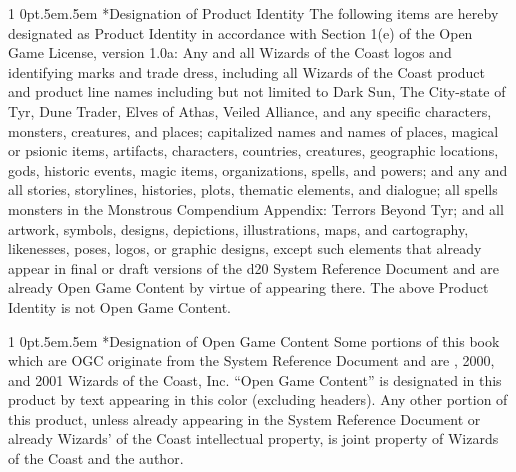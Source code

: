 \documentclass[onecolumn,oneside]{d20}
\makeatletter
\renewcommand\section{
  \@startsection{section}
  {1}
  {0pt}{.5em}{.5em}{\color{ChapterColor}\Large\scshape\raggedleft\imfellEnglish}
}
\makeatother
\begin{document}
\section*{Designation of Product Identity}
The following items are hereby designated as Product Identity in accordance with Section 1(e) of the Open Game License, version 1.0a: Any and all Wizards of the Coast logos and identifying marks and trade dress, including all Wizards of the Coast product and product line names including but not limited to Dark Sun, The City-state of Tyr, Dune Trader, Elves of Athas, Veiled Alliance, and any specific characters, monsters, creatures, and places; capitalized names and names of places, magical or psionic items, artifacts, characters, countries, creatures, geographic locations, gods, historic events, magic items, organizations, spells, and powers; and any and all stories, storylines, histories, plots, thematic elements, and dialogue; all spells monsters in the Monstrous Compendium Appendix: Terrors Beyond Tyr; and all artwork, symbols, designs, depictions, illustrations, maps, and cartography, likenesses, poses, logos, or graphic designs, except such elements that already appear in final or draft versions of the d20 System Reference Document and are already Open Game Content by virtue of appearing there. The above Product Identity is not Open Game Content.

\section*{Designation of Open Game Content}
Some portions of this book which are OGC originate from the System Reference Document and are , 2000, and 2001 Wizards of the Coast, Inc. ``Open Game Content'' is designated in this product by text appearing in this color (excluding headers). Any other portion of this product, unless already appearing in the System Reference Document or already Wizards' of the Coast intellectual property, is joint property of Wizards of the Coast and the author.
\end{document}
